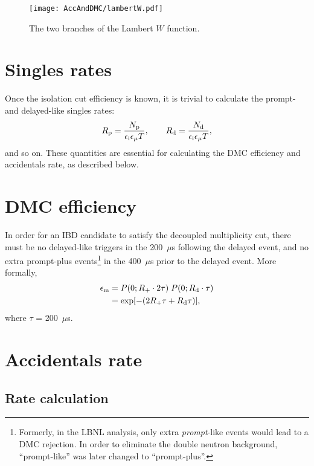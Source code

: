 \documentclass[../thesis.tex]{subfiles}
\begin{document}
\begin{figure}
  \centering \texttt{[image: AccAndDMC/lambertW.pdf]}
  \caption{The two branches of the Lambert $W$ function.}
  \label{fig:lambertW}
\end{figure}

\section{Singles rates}
\label{sec:singratescalc}

Once the isolation cut efficiency is known, it is trivial to calculate the prompt- and delayed-like singles rates:
\begin{equation}
  \label{eq:accSingRates}
  R_\mathrm{p} = \frac{N_\mathrm{p}}{\epsilon_\mathrm{i} \epsilon_\mathrm{\mu} T},\qquad
  R_\mathrm{d} = \frac{N_\mathrm{d}}{\epsilon_\mathrm{i} \epsilon_\mathrm{\mu} T},
\end{equation}
and so on. These quantities are essential for calculating the DMC efficiency and accidentals rate, as described below.

\section{DMC efficiency}
\label{sec:dmceffcalc}

\def\edmc{\ensuremath{\epsilon_\mathrm{m}}}

In order for an IBD candidate to satisfy the decoupled multiplicity cut, there must be no delayed-like triggers in the 200~$\mu$s following the delayed event, and no extra prompt-plus events\footnote{Formerly, in the LBNL analysis, only extra \emph{prompt}-like events would lead to a DMC rejection. In order to
  eliminate the double neutron background, ``prompt-like'' was later changed to
  ``prompt-plus''.} in the 400~$\mu$s prior to the delayed event. More formally,
\begin{align}
  \edmc &= P(0; \Rplu \cdot 2\tau)\;P(0; \Rdel \cdot \tau) \nonumber \\
        &= \exp [-(2\Rplu\tau + \Rdel\tau)],
          \label{eq:dmcEff}
\end{align}
where $\tau$ = 200~$\mu$s.

\section{Accidentals rate}
\label{sec:accratecalc}

\subsection{Rate calculation}
\label{sec:accRateCalc}
\end{document}
